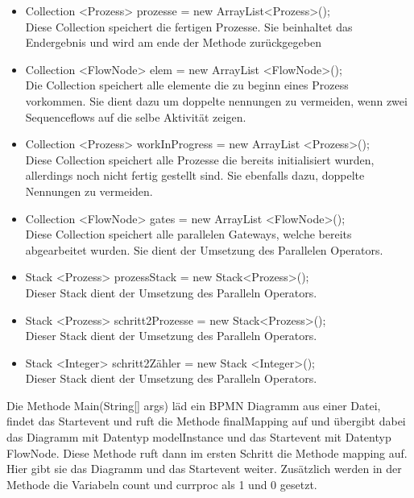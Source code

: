 \begin{itemize}
\item Collection <Prozess> prozesse = new ArrayList<Prozess>();\\  Diese Collection speichert die fertigen Prozesse. Sie beinhaltet das Endergebnis und wird am ende der Methode zurückgegeben
\item Collection <FlowNode> elem = new ArrayList <FlowNode>();\\ Die Collection speichert alle elemente die zu beginn eines Prozess vorkommen. Sie dient dazu um doppelte nennungen zu vermeiden, wenn zwei Sequenceflows auf die selbe Aktivität zeigen.
\item Collection <Prozess> workInProgress = new ArrayList <Prozess>();\\ Diese Collection speichert alle Prozesse die bereits initialisiert wurden, allerdings noch nicht fertig gestellt sind. Sie ebenfalls dazu, doppelte Nennungen zu vermeiden.
\item Collection <FlowNode> gates = new ArrayList <FlowNode>();\\ Diese Collection speichert alle parallelen Gateways, welche bereits abgearbeitet wurden. Sie dient der Umsetzung des Parallelen Operators.
\item Stack <Prozess> prozessStack = new Stack<Prozess>();\\ Dieser Stack dient der Umsetzung des Paralleln Operators.
\item Stack <Prozess> schritt2Prozesse = new Stack<Prozess>();\\ Dieser Stack dient der Umsetzung des Paralleln Operators.
\item Stack <Integer> schritt2Zähler = new Stack <Integer>();\\ Dieser Stack dient der Umsetzung des Paralleln Operators.
\end{itemize}
Die Methode Main(String[] args) läd ein BPMN Diagramm aus einer Datei, findet das Startevent und ruft die Methode finalMapping auf und übergibt dabei das Diagramm mit Datentyp modelInstance und das Startevent mit Datentyp FlowNode. Diese Methode ruft dann im ersten Schritt die Methode mapping auf. Hier gibt sie das Diagramm und das Startevent weiter. Zusätzlich werden in der Methode die Variabeln count und currproc als 1 und 0 gesetzt. \\
